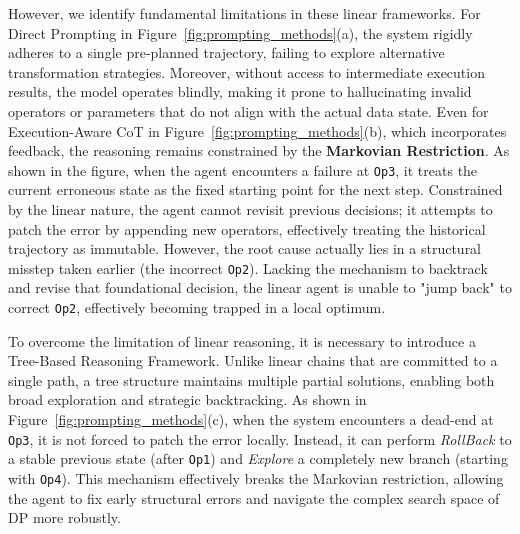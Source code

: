 However, we identify fundamental limitations in these linear frameworks.
For Direct Prompting in Figure~\ref{fig:prompting_methods}(a), the system rigidly adheres to a single pre-planned trajectory, failing to explore alternative transformation strategies. Moreover, without access to intermediate execution results, the model operates blindly, making it prone to hallucinating invalid operators or parameters that do not align with the actual data state.
Even for Execution-Aware CoT in Figure~\ref{fig:prompting_methods}(b), which incorporates feedback, the reasoning remains constrained by the \textbf{Markovian Restriction}.
As shown in the figure, when the agent encounters a failure at \texttt{Op3}, it treats the current erroneous state as the fixed starting point for the next step. Constrained by the linear nature, the agent cannot revisit previous decisions; it attempts to patch the error by appending new operators, effectively treating the historical trajectory as immutable.
However, the root cause actually lies in a structural misstep taken earlier (the incorrect \texttt{Op2}). Lacking the mechanism to backtrack and revise that foundational decision, the linear agent is unable to "jump back" to correct \texttt{Op2}, effectively becoming trapped in a local optimum.

To overcome the limitation of linear reasoning, it is necessary to introduce a Tree-Based Reasoning Framework. Unlike linear chains that are committed to a single path, a tree structure maintains multiple partial solutions, enabling both broad exploration and strategic backtracking. As shown in Figure~\ref{fig:prompting_methods}(c), when the system encounters a dead-end at \texttt{Op3}, it is not forced to patch the error locally. Instead, it can perform \textit{RollBack} to a stable previous state (\eg after \texttt{Op1}) and \textit{Explore} a completely new branch (starting with \texttt{Op4}). This mechanism effectively breaks the Markovian restriction, allowing the agent to fix early structural errors and navigate the complex search space of DP more robustly.

